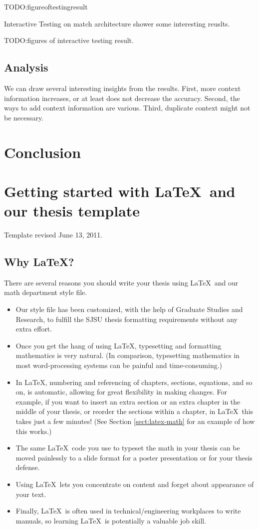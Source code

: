 \documentclass[modernstyle,12pt]{sjsuthesis}
\theoremstyle{definition}
\begin{document}
TODO:figureoftestingresult

Interactive Testing on match architecture shower some interesting reuslts.

TODO:figures of interactive testing result.

\section{Analysis}
We can draw several interesting insights from the results. First, more context information increases, or at least does not decrease the accuracy. Second, the ways to add context information are various. Third, duplicate context might not be necessary.





\chapter{Conclusion}

\chapter{Getting started with \LaTeX\ and our thesis template}

Template revised June 13, 2011.

\section{Why \LaTeX?}

There are several reasons you should write your thesis using \LaTeX\
and our math department style file.

\begin{itemize}
\item Our style file has been customized, with the help of Graduate
  Studies and Research, to fulfill the SJSU thesis formatting
  requirements without any extra effort.
\item Once you get the hang of using \LaTeX, typesetting and
  formatting mathematics is very natural.  (In comparison, typesetting
  mathematics in most word-processing systems can be painful and
  time-consuming.)
\item In \LaTeX, numbering and referencing of chapters, sections,
  equations, and so on, is automatic, allowing for great flexibility
  in making changes.  For example, if you want to insert an extra
  section or an extra chapter in the middle of your thesis, or reorder
  the sections within a chapter, in \LaTeX\ this takes just a few
  minutes!  (See Section \ref{sect:latex-math} for an example of how
  this works.)
\item The same \LaTeX\ code you use to typeset the math in your thesis
  can be moved painlessly to a slide format for a poster presentation
  or for your thesis defense.
\item Using \LaTeX\ lets you concentrate on content and forget about
  appearance of your text.
\item Finally, \LaTeX\ is often used in technical/engineering
  workplaces to write manuals, so learning \LaTeX\ is potentially a
  valuable job skill.
\end{itemize}
\end{document}
